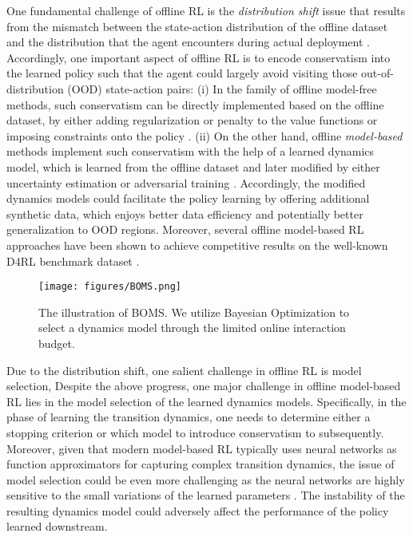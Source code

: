 One fundamental challenge of offline RL is the \textit{distribution shift} issue that results from the mismatch between the state-action distribution of the offline dataset and the distribution that the agent encounters during actual deployment \cite{kumar2019stabilizing,levine2020offline,kumar2020conservative}. 
Accordingly, one important aspect of offline RL is to encode conservatism into the learned policy such that the agent could largely avoid visiting those out-of-distribution (OOD) state-action pairs: (i) In the family of offline model-free methods, such conservatism can be directly implemented based on the offline dataset, by either adding regularization or penalty to the value functions \cite{kumar2020conservative, kostrikov2021offline, bai2022pessimistic} or imposing constraints onto the policy \cite{fujimoto2019off, fujimoto2021minimalist, nair2020awac}. (ii) On the other hand, offline \textit{model-based} methods implement such conservatism with the help of a learned dynamics model, which is learned from the offline dataset and later modified by either uncertainty estimation \cite{yu2020mopo, kidambi2020morel} or adversarial training \cite{rigter2022rambo}. Accordingly, the modified dynamics models could facilitate the policy learning by offering additional synthetic data, which enjoys better data efficiency and potentially better generalization to OOD regions. Moreover, several offline model-based RL approaches \cite{rigter2022rambo,bhardwaj2023adversarial} have been shown to achieve competitive results on the well-known D4RL benchmark dataset \cite{fu2020d4rl}.
\begin{figure}
    \centering
    \texttt{[image: figures/BOMS.png]}
    \caption{The illustration of BOMS. We utilize Bayesian Optimization to select a dynamics model through the limited online interaction budget.}
    \label{fig:BOMS}
\end{figure}

Due to the distribution shift, one salient challenge in offline RL is model selection, 
Despite the above progress, one major challenge in offline model-based RL lies in the model selection of the learned dynamics models. Specifically, in the phase of learning the transition dynamics, one needs to determine either a stopping criterion or which model to introduce conservatism to subsequently. Moreover, given that modern model-based RL typically uses neural networks as function approximators for capturing complex transition dynamics, the issue of model selection could be even more challenging as the neural networks are highly sensitive to the small variations of the learned parameters \cite{jacot2018neural}. The instability of the resulting dynamics model could adversely affect the performance of the policy learned downstream.

